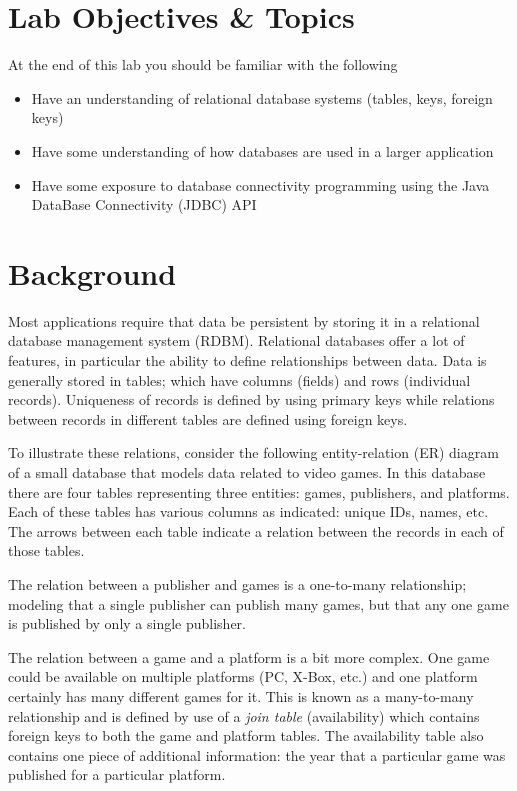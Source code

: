 \documentclass[12pt]{scrartcl}
\begin{document}
\section{Lab Objectives \& Topics}
At the end of this lab you should be familiar with the following
\begin{itemize}
  \item Have an understanding of relational database systems (tables, 
  	keys, foreign keys) 
  \item Have some understanding of how databases are used in a 
	larger application
  \item Have some exposure to database connectivity programming 
	using the Java DataBase Connectivity (JDBC) API
\end{itemize}

\section{Background}

Most applications require that data be persistent by storing it in 
a relational database management system (RDBM).  Relational 
databases offer a lot of features, in particular the ability to define 
relationships between data.  Data is generally stored in tables;
which have columns (fields) and rows (individual records).  
Uniqueness of records is defined by using primary keys while 
relations between records in different tables are defined using 
foreign keys.

To illustrate these relations, consider the following entity-relation 
(ER) diagram of a small database that models data related to 
video games.  In this database there are four tables representing 
three entities: games, publishers, and platforms.  Each of these 
tables has various columns as indicated: unique IDs, names, etc.  
The arrows between each table indicate a relation between the 
records in each of those tables.

The relation between a publisher and games is a one-to-many 
relationship; modeling that a single publisher can publish many 
games, but that any one game is published by only a single 
publisher.

The relation between a game and a platform is a bit more complex.  
One game could be available on multiple platforms (PC, X-Box, etc.) 
and one platform certainly has many different games for it.  This is 
known as a many-to-many relationship and is defined by use of 
a \emph{join table} (availability) which contains foreign keys to both the 
game and platform tables.  The availability table also contains 
one piece of additional information: the year that a particular 
game was published for a particular platform.
\end{document}
